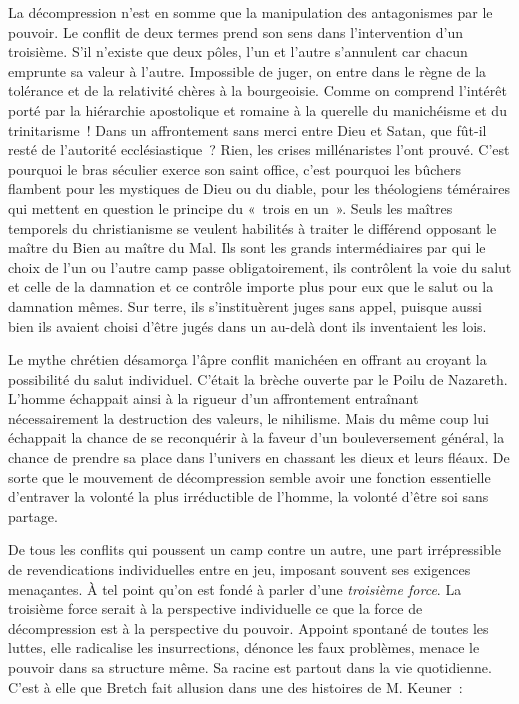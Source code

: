 \documentclass[french,twoside]{book} %
\begin{document}
La décompression n’est en somme que la manipulation des antagonismes par le pouvoir. Le conflit de deux termes prend son sens dans l’intervention d’un troisième. S’il n’existe que deux pôles, l’un et l’autre s’annulent car chacun emprunte sa valeur à l’autre. Impossible de juger, on entre dans le règne de la tolérance et de la relativité chères à la bourgeoisie. Comme on comprend l’intérêt porté par la hiérarchie apostolique et romaine à la querelle du manichéisme et du trinitarisme ! Dans un affrontement sans merci entre Dieu et Satan, que fût-il resté de l’autorité ecclésiastique ? Rien, les crises millénaristes l’ont prouvé. C’est pourquoi le bras séculier exerce son saint office, c’est pourquoi les bûchers flambent pour les mystiques de Dieu ou du diable, pour les théologiens téméraires qui mettent en question le principe du « trois en un ». Seuls les maîtres temporels du christianisme se veulent habilités à traiter le différend opposant le maître du Bien au maître du Mal. Ils sont les grands intermédiaires par qui le choix de l’un ou l’autre camp passe obligatoirement, ils contrôlent la voie du salut et celle de la damnation et ce contrôle importe plus pour eux que le salut ou la damnation mêmes. Sur terre, ils s’instituèrent juges sans appel, puisque aussi bien ils avaient choisi d’être jugés dans un au-delà dont ils inventaient les lois.\par
Le mythe chrétien désamorça l’âpre conflit manichéen en offrant au croyant la possibilité du salut individuel. C’était la brèche ouverte par le Poilu de Nazareth. L’homme échappait ainsi à la rigueur d’un affrontement entraînant nécessairement la destruction des valeurs, le nihilisme. Mais du même coup lui échappait la chance de se reconquérir à la faveur d’un bouleversement général, la chance de prendre sa place dans l’univers en chassant les dieux et leurs fléaux. De sorte que le mouvement de décompression semble avoir une fonction essentielle d’entraver la volonté la plus irréductible de l’homme, la volonté d’être soi sans partage.\par
De tous les conflits qui poussent un camp contre un autre, une part irrépressible de revendications individuelles entre en jeu, imposant souvent ses exigences menaçantes. À tel point qu’on est fondé à parler d’une \emph{troisième force}. La troisième force serait à la perspective individuelle ce que la force de décompression est à la perspective du pouvoir. Appoint spontané de toutes les luttes, elle radicalise les insurrections, dénonce les faux problèmes, menace le pouvoir dans sa structure même. Sa racine est partout dans la vie quotidienne. C’est à elle que Bretch fait allusion dans une des histoires de M. Keuner :\par
\end{document}
